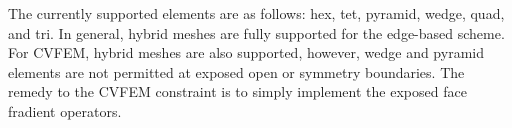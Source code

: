 The currently supported elements are as follows: hex, tet, pyramid, wedge, quad, and tri. 
In general, hybrid meshes are fully supported for the edge-based scheme. For CVFEM,
hybrid meshes are also supported, however, wedge and pyramid elements are not permitted
at exposed open or symmetry boundaries. The remedy to the CVFEM constraint is to
simply implement the exposed face fradient operators.
